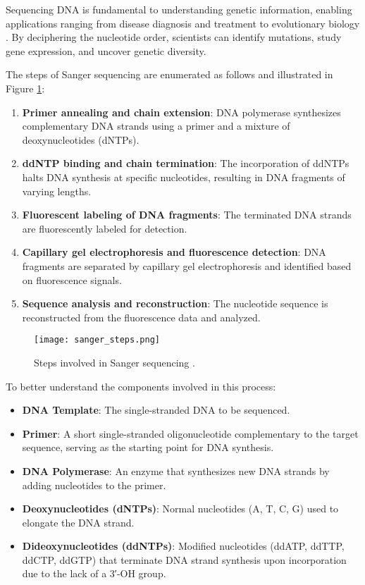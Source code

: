 Sequencing DNA is fundamental to understanding genetic information, enabling applications ranging from disease diagnosis and treatment to evolutionary biology \cite{turn0search0}. By deciphering the nucleotide order, scientists can identify mutations, study gene expression, and uncover genetic diversity.

The steps of Sanger sequencing are enumerated as follows and illustrated in Figure \ref{fig:sanger_steps}: 
\begin{enumerate} 
\item \textbf{Primer annealing and chain extension}: DNA polymerase synthesizes complementary DNA strands using a primer and a mixture of deoxynucleotides (dNTPs). 
\item \textbf{ddNTP binding and chain termination}: The incorporation of ddNTPs halts DNA synthesis at specific nucleotides, resulting in DNA fragments of varying lengths. 
\item \textbf{Fluorescent labeling of DNA fragments}: The terminated DNA strands are fluorescently labeled for detection. 
\item \textbf{Capillary gel electrophoresis and fluorescence detection}: DNA fragments are separated by capillary gel electrophoresis and identified based on fluorescence signals. 
\item \textbf{Sequence analysis and reconstruction}: The nucleotide sequence is reconstructed from the fluorescence data and analyzed. 
\end{enumerate}

\begin{figure}[H]
\centering
\texttt{[image: sanger\_steps.png]}
\caption{Steps involved in Sanger sequencing \cite{biotechreality_sanger_steps}.}
\label{fig:sanger_steps}
\end{figure}

To better understand the components involved in this process:
\begin{itemize}
    \item \textbf{DNA Template}: The single-stranded DNA to be sequenced.
    \item \textbf{Primer}: A short single-stranded oligonucleotide complementary to the target sequence, serving as the starting point for DNA synthesis.
    \item \textbf{DNA Polymerase}: An enzyme that synthesizes new DNA strands by adding nucleotides to the primer.
    \item \textbf{Deoxynucleotides (dNTPs)}: Normal nucleotides (A, T, C, G) used to elongate the DNA strand.
    \item \textbf{Dideoxynucleotides (ddNTPs)}: Modified nucleotides (ddATP, ddTTP, ddCTP, ddGTP) that terminate DNA strand synthesis upon incorporation due to the lack of a 3′-OH group.
\end{itemize}

